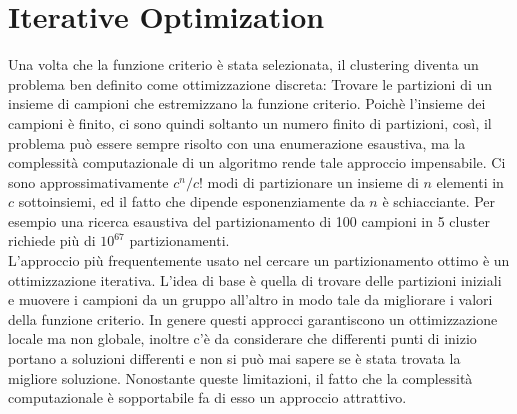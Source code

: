 \section{Iterative Optimization}
Una volta che la funzione criterio è stata selezionata, il clustering diventa un problema ben definito come ottimizzazione discreta: Trovare le partizioni di un insieme di campioni che estremizzano la funzione criterio. Poichè l'insieme dei campioni è finito, ci sono quindi soltanto un numero finito di partizioni, così, il problema può essere sempre risolto con una enumerazione esaustiva, ma la complessità computazionale di un algoritmo rende tale approccio impensabile. Ci sono approssimativamente $c^n /c!$ modi di partizionare un insieme di $n$ elementi in $c$ sottoinsiemi, ed il fatto che dipende esponenziamente da $n$ è schiacciante. Per esempio una ricerca esaustiva del partizionamento di 100 campioni in 5 cluster richiede più di $10^{67}$ partizionamenti. \\

\noindent L'approccio più frequentemente usato nel cercare un partizionamento ottimo è un ottimizzazione iterativa. L'idea di base è quella di trovare delle partizioni iniziali e muovere i campioni da un gruppo all'altro in modo tale da migliorare i valori della funzione criterio.  In genere questi approcci garantiscono un ottimizzazione locale ma non globale, inoltre c'è da considerare che differenti punti di inizio portano a soluzioni differenti e non si può mai sapere se è stata trovata la migliore soluzione. Nonostante queste limitazioni, il fatto che la complessità computazionale è sopportabile fa di esso un approccio attrattivo.\\

